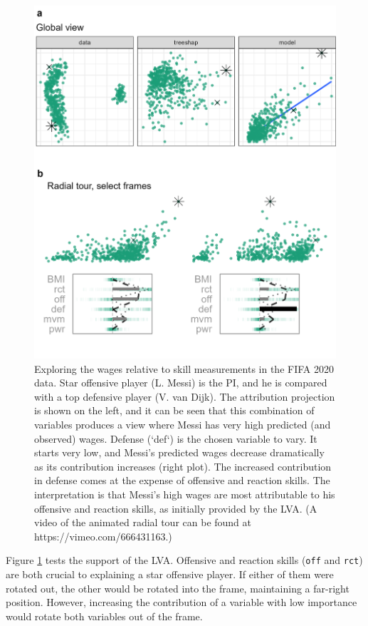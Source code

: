\documentclass[
]{article}
\begin{document}
\begin{figure}

{\centering \includegraphics[width=0.9\linewidth]{./figures/case_fifa} 

}

\caption{Exploring the wages relative to skill measurements in the FIFA 2020 data. Star offensive player (L. Messi) is the PI, and he is compared with a top defensive player (V. van Dijk). The attribution projection is shown on the left, and it can be seen that this combination of variables produces a view where Messi has very high predicted (and observed) wages. Defense (`def`) is the chosen variable to vary. It starts very low, and Messi's predicted wages decrease dramatically as its contribution increases (right plot). The increased contribution in defense comes at the expense of offensive and reaction skills. The interpretation is that Messi's high wages are most attributable to his offensive and reaction skills, as initially provided by the LVA. (A video of the animated radial tour can be found at https://vimeo.com/666431163.)}\label{fig:casefifa}
\end{figure}

Figure \ref{fig:casefifa} tests the support of the LVA. Offensive and reaction skills (\texttt{off} and \texttt{rct}) are both crucial to explaining a star offensive player. If either of them were rotated out, the other would be rotated into the frame, maintaining a far-right position. However, increasing the contribution of a variable with low importance would rotate both variables out of the frame.
\end{document}
